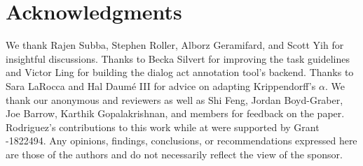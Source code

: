\section*{Acknowledgments}

We thank Rajen Subba, Stephen Roller, Alborz Geramifard, and Scott Yih for insightful discussions.
Thanks to Becka Silvert for improving the task guidelines and Victor Ling for building the dialog act annotation tool's backend.
Thanks to Sara LaRocca and Hal Daum\'e III for advice on adapting Krippendorff's $\alpha$.
We thank our anonymous  and  reviewers as well as Shi Feng, Jordan Boyd-Graber, Joe Barrow, Karthik Gopalakrishnan, and   members for feedback on the paper.
Rodriguez's contributions to this work while at  were supported by  Grant -1822494.
Any opinions, findings, conclusions, or recommendations expressed here are those of the authors and do not necessarily reflect the view of the sponsor.